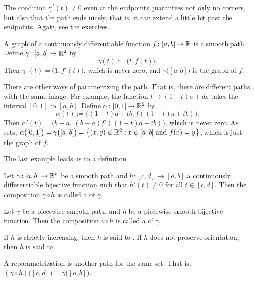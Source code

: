 The condition $\gamma^{\:\prime}(t) \not= 0$ even at the endpoints guarantees
not only no corners, but also that the path ends nicely, that is, it can
extend a little bit past the endpoints.  Again, see the exercises.

\begin{example}
A graph of a continuously differentiable function $f \colon [a,b] \to {\mathbb{R}}$ is a smooth path.
Define $\gamma \colon [a,b] \to {\mathbb{R}}^2$ by
\begin{equation*}
\gamma(t) := \bigl(t,f(t)\bigr) .
\end{equation*}
Then $\gamma^{\:\prime}(t) = \bigl( 1 , f'(t) \bigr)$, which is never zero,
and $\gamma\bigl([a,b]\bigr)$ is the graph of $f$.

There are other ways of parametrizing the path.  That is, there are
different paths with the same image.  For example,
the function $t \mapsto (1-t)a+tb$, takes the interval $[0,1]$ to $[a,b]$.
Define
$\alpha \colon [0,1] \to {\mathbb{R}}^2$ by
\begin{equation*}
\alpha(t) := \bigl((1-t)a+tb,f((1-t)a+tb)\bigr) .
\end{equation*}
Then
$\alpha'(t) = \bigl( b-a ,~ (b-a)f'((1-t)a+tb) \bigr)$, which is never zero.
As sets, $\alpha\bigl([0,1]\bigr) = \gamma\bigl([a,b]\bigr)
= \bigl\{ (x,y) \in {\mathbb{R}}^2 : x \in [a,b] \text{ and } f(x) = y \bigr\}$,
which is just the graph of $f$.
\end{example}

The last example leads us to a definition.

\begin{defn}
Let $\gamma \colon [a,b] \to {\mathbb{R}}^n$ be a smooth path and
$h \colon [c,d] \to [a,b]$ a continuously differentiable bijective function
such that $h'(t) \not= 0$ for all $t \in [c,d]$.  Then
the composition
$\gamma \circ h$ is called a
\emph{}
of $\gamma$.

Let $\gamma$ be a piecewise smooth path,
and $h$ be a piecewise smooth bijective function.  Then
the composition
$\gamma \circ h$ is called a
\emph{} of $\gamma$.

If $h$ is strictly increasing, then $h$ is 
said to \emph{}.  If $h$ does not preserve
orientation, then $h$ is said to \emph{}.
\end{defn}

A reparametrization is another path for the same set.  That is,
$(\gamma \circ h)\bigl([c,d]\bigr) =
\gamma \bigl([a,b]\bigr)$.

